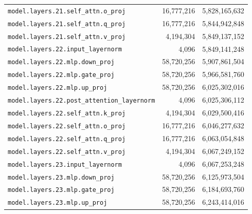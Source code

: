 \documentclass[10pt,a4paper]{article}
\theoremstyle{definition}
\begin{document}
\begin{appendices}
\begin{longtable}{p{9.5cm}rr}
\texttt{model.\allowbreak{}layers.\allowbreak{}21.\allowbreak{}self\_attn.\allowbreak{}o\_proj} & 16,777,216 & 5,828,165,632 \\
\texttt{model.\allowbreak{}layers.\allowbreak{}21.\allowbreak{}self\_attn.\allowbreak{}q\_proj} & 16,777,216 & 5,844,942,848 \\
\texttt{model.\allowbreak{}layers.\allowbreak{}21.\allowbreak{}self\_attn.\allowbreak{}v\_proj} & 4,194,304 & 5,849,137,152 \\
\texttt{model.\allowbreak{}layers.\allowbreak{}22.\allowbreak{}input\_layernorm} & 4,096 & 5,849,141,248 \\
\texttt{model.\allowbreak{}layers.\allowbreak{}22.\allowbreak{}mlp.\allowbreak{}down\_proj} & 58,720,256 & 5,907,861,504 \\
\texttt{model.\allowbreak{}layers.\allowbreak{}22.\allowbreak{}mlp.\allowbreak{}gate\_proj} & 58,720,256 & 5,966,581,760 \\
\texttt{model.\allowbreak{}layers.\allowbreak{}22.\allowbreak{}mlp.\allowbreak{}up\_proj} & 58,720,256 & 6,025,302,016 \\
\texttt{model.\allowbreak{}layers.\allowbreak{}22.\allowbreak{}post\_attention\_layernorm} & 4,096 & 6,025,306,112 \\
\texttt{model.\allowbreak{}layers.\allowbreak{}22.\allowbreak{}self\_attn.\allowbreak{}k\_proj} & 4,194,304 & 6,029,500,416 \\
\texttt{model.\allowbreak{}layers.\allowbreak{}22.\allowbreak{}self\_attn.\allowbreak{}o\_proj} & 16,777,216 & 6,046,277,632 \\
\texttt{model.\allowbreak{}layers.\allowbreak{}22.\allowbreak{}self\_attn.\allowbreak{}q\_proj} & 16,777,216 & 6,063,054,848 \\
\texttt{model.\allowbreak{}layers.\allowbreak{}22.\allowbreak{}self\_attn.\allowbreak{}v\_proj} & 4,194,304 & 6,067,249,152 \\
\texttt{model.\allowbreak{}layers.\allowbreak{}23.\allowbreak{}input\_layernorm} & 4,096 & 6,067,253,248 \\
\texttt{model.\allowbreak{}layers.\allowbreak{}23.\allowbreak{}mlp.\allowbreak{}down\_proj} & 58,720,256 & 6,125,973,504 \\
\texttt{model.\allowbreak{}layers.\allowbreak{}23.\allowbreak{}mlp.\allowbreak{}gate\_proj} & 58,720,256 & 6,184,693,760 \\
\texttt{model.\allowbreak{}layers.\allowbreak{}23.\allowbreak{}mlp.\allowbreak{}up\_proj} & 58,720,256 & 6,243,414,016 \\

\end{longtable}
\end{appendices}
\end{document}

